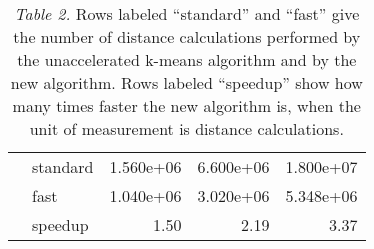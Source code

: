 \begin{table}
\begin{tabular}{|llrrr|}
             & standard   &   1.560e+06 &    6.600e+06 &     1.800e+07 \\
             & fast       &   1.040e+06 &    3.020e+06 &     5.348e+06 \\
             & speedup    &        1.50 &         2.19 &          3.37 \\ \hline
  \end{tabular}
  \caption*{\footnotesize \textit{Table 2.} Rows labeled ``standard'' and ``fast'' give the number of distance calculations performed by the unaccelerated k-means algorithm and by the new algorithm. Rows labeled ``speedup'' show how many times faster the new algorithm is, when the unit of measurement is distance calculations.}
\end{table}
